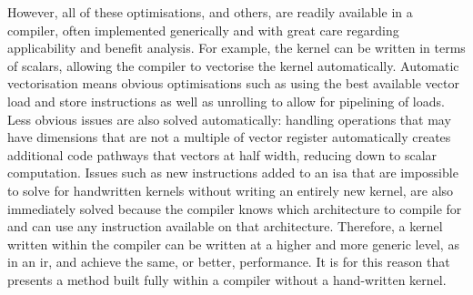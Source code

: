 \documentclass[\main/thesis.tex]{subfiles}
\begin{document}
However, all of these optimisations, and others, are readily available in a compiler, often implemented generically and with great care regarding applicability and benefit analysis.
For example, the kernel can be written in terms of scalars, allowing the compiler to vectorise the kernel automatically.
Automatic vectorisation means obvious optimisations such as using the best available vector load and store instructions as well as unrolling to allow for pipelining of loads.
Less obvious issues are also solved automatically: handling operations that may have dimensions that are not a multiple of vector register automatically creates additional code pathways that vectors at half width, reducing down to scalar computation.
Issues such as new instructions added to an \gls{isa} that are impossible to solve for handwritten kernels without writing an entirely new kernel, are also immediately solved because the compiler knows which architecture to compile for and can use any instruction available on that architecture.
Therefore, a kernel written within the compiler can be written at a higher and more generic level, as in an \gls{ir}, and achieve the same, or better, performance.
It is for this reason that  presents a method built fully within a compiler without a hand-written kernel.
\end{document}
